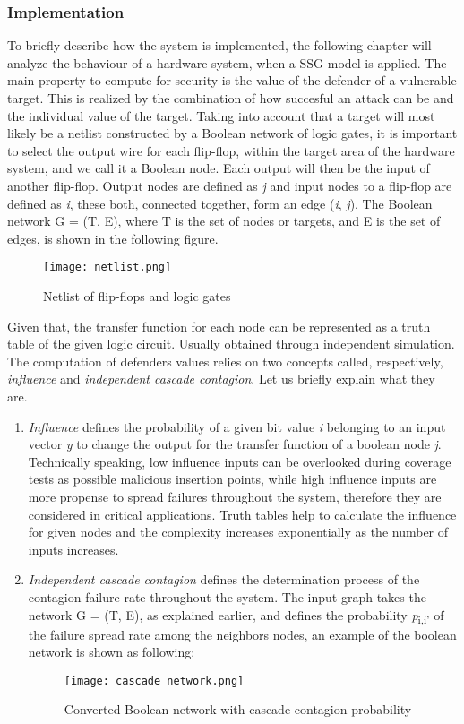 \documentclass[conference]{IEEEtran}
\begin{document}
\subsubsection{Implementation}
To briefly describe how the system is implemented, the following chapter will analyze the behaviour of a hardware system, when a SSG model is applied.
The main property to compute for security is the value of the defender of a vulnerable target. This is realized by the combination of how succesful an attack can be and the individual value of the target. Taking into account that a target will most likely be a netlist constructed by a Boolean network of logic gates, it is important to select the output wire for each flip-flop, within the target area of the hardware system, and we call it a Boolean node. Each output will then be the input of another flip-flop. Output nodes are defined as \textit{j} and input nodes to a flip-flop are defined as \textit{i}, these both, connected together, form an edge (\textit{i}, \textit{j}). The Boolean network G = (T, E), where T is the set of nodes or targets, and E is the set of edges, is shown in the following figure.
\begin{figure}[h]
    \centerline{\texttt{[image: netlist.png]}}
    \caption{Netlist of flip-flops and logic gates \cite{b9}}
    \label{netlist}
\end{figure} 

Given that, the transfer function for each node can be represented as a truth table of the given logic circuit. Usually obtained through independent simulation. The computation of defenders values relies on two concepts called, respectively, \textit{influence} and \textit{independent cascade contagion}. Let us briefly explain what they are.
\begin{enumerate}
\item \textit{Influence} defines the probability of a given bit value \textit{i} belonging to an input vector \textit{y} to change the output  for the transfer function of a boolean node \textit{j}. Technically speaking, low influence inputs can be overlooked during coverage tests as possible malicious insertion points, while high influence inputs are more propense to spread failures throughout the system, therefore they are considered in critical applications. Truth tables help to calculate the influence for given nodes and the complexity increases exponentially as the number of inputs increases.
\item \textit{Independent cascade contagion} defines the determination process of the contagion failure rate throughout the system. The input graph takes the network G = (T, E), as explained earlier, and defines the probability \textit{p}\textsubscript{i,i'} of the failure spread rate among the neighbors nodes, an example of the boolean network is shown as following:
\begin{figure}[h]
    \centerline{\texttt{[image: cascade network.png]}}
    \caption{Converted Boolean network with cascade contagion probability \cite{b9}}
    \label{cascade}
\end{figure} 

\end{enumerate}
\end{document}
